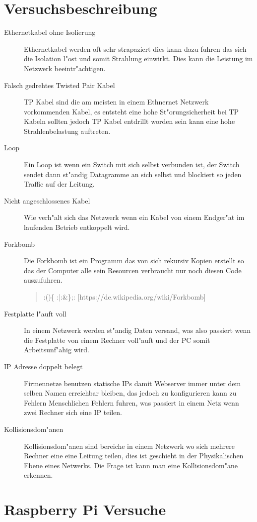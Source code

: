 \section{Versuchsbeschreibung}
\label{sec:versuchbeschreibung}
\begin{description}
\item[Ethernetkabel ohne Isolierung] Ethernetkabel werden oft sehr strapaziert %
dies kann dazu fuhren das sich die Isolation l"ost und somit Strahlung einwirkt. %
Dies kann die Leistung im Netzwerk beeintr"achtigen. 
\item[Falsch gedrehtes Twisted Pair Kabel] TP Kabel sind die am meisten in einem Ethnernet %
Netzwerk vorkommenden Kabel, es entsteht eine hohe St"orungsicherheit bei TP Kabeln %
sollten jedoch TP Kabel entdrillt worden sein kann eine hohe Strahlenbelastung auftreten. %
\item[Loop] Ein Loop ist wenn ein Switch mit sich selbst verbunden ist, der Switch sendet %
dann st"andig Datagramme an sich selbst und blockiert so jeden Traffic auf der Leitung. %
\item[Nicht angeschlossenes Kabel] Wie verh"alt sich das Netzwerk wenn ein Kabel von einem %
Endger"at im laufenden Betrieb entkoppelt wird.
\item[Forkbomb] Die Forkbomb ist ein Programm das von sich rekursiv Kopien erstellt %
so das der Computer alle sein Resourcen verbraucht nur noch diesen Code auszufuhren. %
\begin{quote} 
:()\{ :|:\&\};: [https://de.wikipedia.org/wiki/Forkbomb] 
\end{quote}
\item[Festplatte l"auft voll] In einem Netzwerk werden st"andig Daten versand, was also %
passiert wenn die Festplatte von einem Rechner voll"auft und der PC somit Arbeitsunf"ahig wird. %
\item[IP Adresse doppelt belegt] Firmennetze benutzen statische IPs damit Webserver immer unter %
dem selben Namen erreichbar bleiben, das jedoch zu konfigurieren kann zu Fehlern Menschlichen %
Fehlern fuhren, was passiert in einem Netz wenn zwei Rechner sich eine IP teilen. %
\item[Kollisionsdom"anen] Kollisionsdom"anen sind bereiche in einem Netzwerk wo sich mehrere Rechner eine %
eine Leitung teilen, dies ist geschieht in der Physikalischen Ebene eines Netwerks. Die Frage ist kann
man eine Kollisionsdom"ane erkennen. 
\end{description}
\section{Raspberry Pi Versuche}
\label{sec:raspberryPiVersuche}
